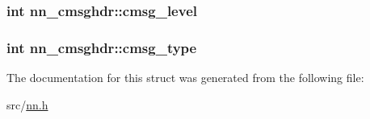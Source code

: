 \subsubsection[{cmsg\+\_\+level}]{\setlength{\rightskip}{0pt plus 5cm}int nn\+\_\+cmsghdr\+::cmsg\+\_\+level}\hypertarget{structnn__cmsghdr_a032fd87fda6598a0038492a67f988588}{}\label{structnn__cmsghdr_a032fd87fda6598a0038492a67f988588}
\subsubsection[{cmsg\+\_\+type}]{\setlength{\rightskip}{0pt plus 5cm}int nn\+\_\+cmsghdr\+::cmsg\+\_\+type}\hypertarget{structnn__cmsghdr_afdca1067604788429d246880beb07bff}{}\label{structnn__cmsghdr_afdca1067604788429d246880beb07bff}


The documentation for this struct was generated from the following file\+:\begin{DoxyCompactItemize}
\item 
src/\hyperlink{nn_8h}{nn.\+h}\end{DoxyCompactItemize}
